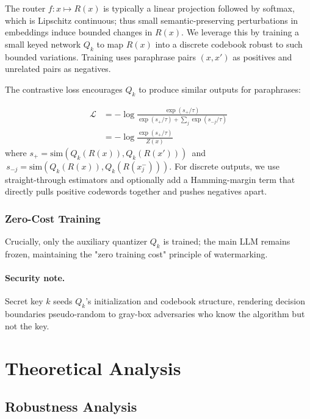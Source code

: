 The router $f: x \mapsto R(x)$ is typically a linear projection followed by softmax, which is Lipschitz continuous; thus small semantic-preserving perturbations in embeddings induce bounded changes in $R(x)$. We leverage this by training a small keyed network $Q_k$ to map $R(x)$ into a discrete codebook robust to such bounded variations. Training uses paraphrase pairs $(x,x')$ as positives and unrelated pairs as negatives.

The contrastive loss encourages $Q_k$ to produce similar outputs for paraphrases:

\begin{align}
\mathcal{L} &= -\log \frac{\exp(s_{+}/\tau)}{\exp(s_{+}/\tau) + \sum_j \exp(s_{-j}/\tau)} \nonumber \\
&= -\log \frac{\exp(s_{+}/\tau)}{Z(x)} \label{eq:contrastive_loss}
\end{align}
where $s_{+} = \text{sim}(Q_k(R(x)), Q_k(R(x')))\,$ and $\,s_{-j} = \text{sim}(Q_k(R(x)), Q_k(R(x_j^-)))$. For discrete outputs, we use straight-through estimators and optionally add a Hamming-margin term that directly pulls positive codewords together and pushes negatives apart.

\subsubsection{Zero-Cost Training}

Crucially, only the auxiliary quantizer $Q_k$ is trained; the main LLM remains frozen, maintaining the "zero training cost" principle of watermarking.

\paragraph{Security note.} Secret key $k$ seeds $Q_k$'s initialization and codebook structure, rendering decision boundaries pseudo-random to gray-box adversaries who know the algorithm but not the key.

\section{Theoretical Analysis}

\subsection{Robustness Analysis}

